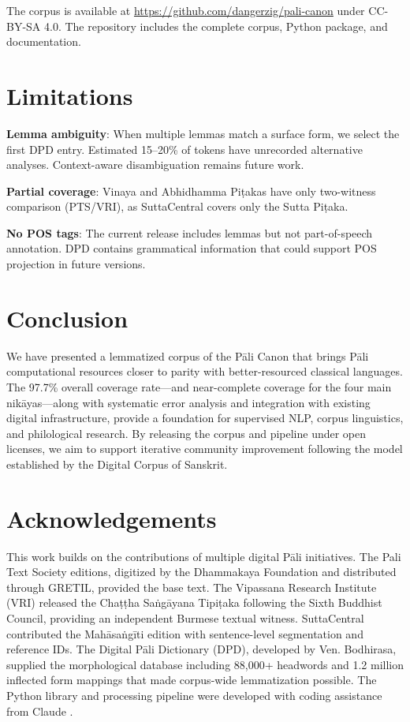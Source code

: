 \documentclass[11pt,twocolumn]{article}
\begin{document}
The corpus is available at \url{https://github.com/dangerzig/pali-canon} under CC-BY-SA 4.0. The repository includes the complete corpus, Python package, and documentation.

\section{Limitations}
\label{sec:limitations}

\textbf{Lemma ambiguity}: When multiple lemmas match a surface form, we select the first DPD entry. Estimated 15--20\% of tokens have unrecorded alternative analyses. Context-aware disambiguation remains future work.

\textbf{Partial coverage}: Vinaya and Abhidhamma Piṭakas have only two-witness comparison (PTS/VRI), as SuttaCentral covers only the Sutta Piṭaka.

\textbf{No POS tags}: The current release includes lemmas but not part-of-speech annotation. DPD contains grammatical information that could support POS projection in future versions.

\section{Conclusion}
\label{sec:conclusion}

We have presented a lemmatized corpus of the Pāli Canon that brings Pāli computational resources closer to parity with better-resourced classical languages. The 97.7\% overall coverage rate---and near-complete coverage for the four main nikāyas---along with systematic error analysis and integration with existing digital infrastructure, provide a foundation for supervised NLP, corpus linguistics, and philological research. By releasing the corpus and pipeline under open licenses, we aim to support iterative community improvement following the model established by the Digital Corpus of Sanskrit.

\section*{Acknowledgements}
This work builds on the contributions of multiple digital Pāli initiatives. The Pali Text Society editions, digitized by the Dhammakaya Foundation and distributed through GRETIL, provided the base text. The Vipassana Research Institute (VRI) released the Chaṭṭha Saṅgāyana Tipiṭaka following the Sixth Buddhist Council, providing an independent Burmese textual witness. SuttaCentral contributed the Mahāsaṅgīti edition with sentence-level segmentation and reference IDs. The Digital Pāli Dictionary (DPD), developed by Ven. Bodhirasa, supplied the morphological database including 88,000+ headwords and 1.2 million inflected form mappings that made corpus-wide lemmatization possible. The Python library and processing pipeline were developed with coding assistance from Claude \citep{claude2024}.


\end{document}
